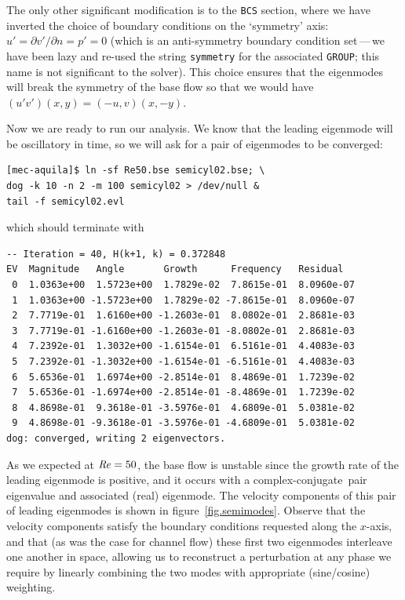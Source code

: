 \documentclass[11pt,a4paper]{report}
\newcommand\Rey{\mbox{\textit{Re}}}
\newcommand\cc{complex-conjugate}
\begin{document}
The only other significant modification is to the \verb+BCS+ section,
where we have inverted the choice of boundary conditions on the
`symmetry' axis: $u'=\partial v'/\partial n=p'=0$ (which is an
anti-symmetry boundary condition set\,---\,we have been lazy and
re-used the string \verb+symmetry+ for the associated \verb+GROUP+;
this name is not significant to the solver).  This choice ensures that
the eigenmodes will break the symmetry of the base flow so that we
would have $(u'v')(x,y)=(-u,v)(x,-y)$.

Now we are ready to run our analysis. We know that the leading
eigenmode will be oscillatory in time, so we will ask for a pair of
eigenmodes to be converged:
\begin{verbatim}
[mec-aquila]$ ln -sf Re50.bse semicyl02.bse; \
dog -k 10 -n 2 -m 100 semicyl02 > /dev/null &
tail -f semicyl02.evl
\end{verbatim}
which should terminate with
{\small
\begin{verbatim}
-- Iteration = 40, H(k+1, k) = 0.372848
EV  Magnitude   Angle       Growth      Frequency   Residual
 0  1.0363e+00  1.5723e+00  1.7829e-02  7.8615e-01  8.0960e-07
 1  1.0363e+00 -1.5723e+00  1.7829e-02 -7.8615e-01  8.0960e-07
 2  7.7719e-01  1.6160e+00 -1.2603e-01  8.0802e-01  2.8681e-03
 3  7.7719e-01 -1.6160e+00 -1.2603e-01 -8.0802e-01  2.8681e-03
 4  7.2392e-01  1.3032e+00 -1.6154e-01  6.5161e-01  4.4083e-03
 5  7.2392e-01 -1.3032e+00 -1.6154e-01 -6.5161e-01  4.4083e-03
 6  5.6536e-01  1.6974e+00 -2.8514e-01  8.4869e-01  1.7239e-02
 7  5.6536e-01 -1.6974e+00 -2.8514e-01 -8.4869e-01  1.7239e-02
 8  4.8698e-01  9.3618e-01 -3.5976e-01  4.6809e-01  5.0381e-02
 9  4.8698e-01 -9.3618e-01 -3.5976e-01 -4.6809e-01  5.0381e-02
dog: converged, writing 2 eigenvectors.
\end{verbatim}
}
\noindent
As we expected at $\Rey=50$, the base flow is unstable since the
growth rate of the leading eigenmode is positive, and it occurs with a
\cc\ pair eigenvalue and associated (real) eigenmode.  The velocity
components of this pair of leading eigenmodes is shown in
figure~\ref{fig.semimodes}.  Observe that the velocity components
satisfy the boundary conditions requested along the $x$-axis, and that
(as was the case for channel flow) these first two eigenmodes
interleave one another in space, allowing us to reconstruct a
perturbation at any phase we require by linearly combining the two
modes with appropriate (sine/cosine) weighting.
\end{document}

